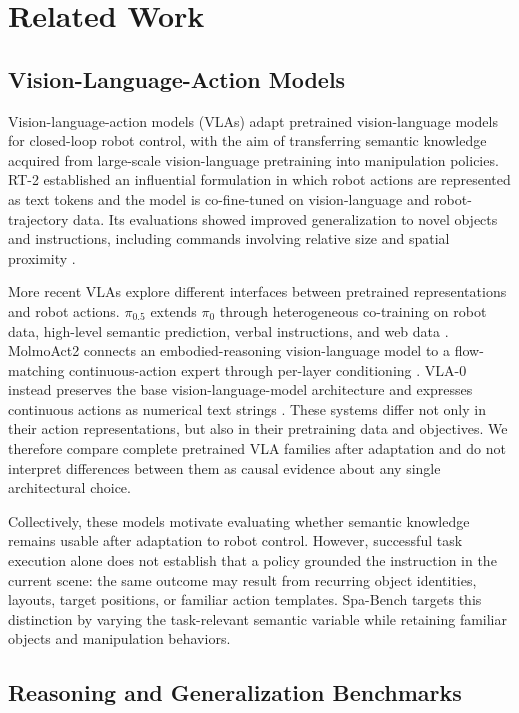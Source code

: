 \section{Related Work}

\subsection{Vision-Language-Action Models}

Vision-language-action models (VLAs) adapt pretrained vision-language models for closed-loop robot control, with the aim of transferring semantic knowledge acquired from large-scale vision-language pretraining into manipulation policies. RT-2 established an influential formulation in which robot actions are represented as text tokens and the model is co-fine-tuned on vision-language and robot-trajectory data. Its evaluations showed improved generalization to novel objects and instructions, including commands involving relative size and spatial proximity \cite{brohan2023rt2}.

More recent VLAs explore different interfaces between pretrained representations and robot actions. $\pi_{0.5}$ extends $\pi_0$ through heterogeneous co-training on robot data, high-level semantic prediction, verbal instructions, and web data \cite{black2025pi05}. MolmoAct2 connects an embodied-reasoning vision-language model to a flow-matching continuous-action expert through per-layer conditioning \cite{fang2026molmoact2}. VLA-0 instead preserves the base vision-language-model architecture and expresses continuous actions as numerical text strings \cite{goyal2025vla0}. These systems differ not only in their action representations, but also in their pretraining data and objectives. We therefore compare complete pretrained VLA families after adaptation and do not interpret differences between them as causal evidence about any single architectural choice.

Collectively, these models motivate evaluating whether semantic knowledge remains usable after adaptation to robot control. However, successful task execution alone does not establish that a policy grounded the instruction in the current scene: the same outcome may result from recurring object identities, layouts, target positions, or familiar action templates. Spa-Bench targets this distinction by varying the task-relevant semantic variable while retaining familiar objects and manipulation behaviors.

\subsection{Reasoning and Generalization Benchmarks}

